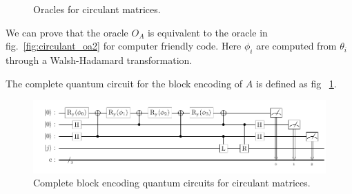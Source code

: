 \documentclass{article}
\begin{document}
\begin{figure}[htbp]
  \centering
  \caption{Oracles for circulant matrices.}
\end{figure}

We can prove that the oracle $O_A$ is equivalent to the oracle in fig.~\ref{fig:circulant_oa2} for computer friendly code. Here $\phi_i$ are computed from $\theta_i$ through a Walsh-Hadamard transformation.

The complete quantum circuit for the block encoding of $A$ is defined as fig ~\ref{fig:circulant_circuit}.

\begin{figure}[htbp]
  \centering
  \includegraphics{pdf/circulant_circuit}
  \caption{
    Complete block encoding quantum circuits for circulant matrices.
  }
  \label{fig:circulant_circuit}
\end{figure}
\end{document}

